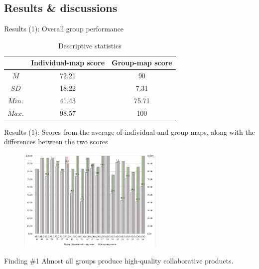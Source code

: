 \subsection{Results \& discussions}
\begin{frame}{Results (1): Overall group performance}
\begin{table}[tb]
    \caption{Descriptive statistics}
    \label{a1::group_performance}
    \begin{center}
        \begin{tabular}{c|c|c}
            \hline
            & Individual-map score & Group-map score\\
            \hline
            $M$ & 72.21 & 90 \\
            $SD$ & 18.22 & 7.31 \\
            $Min.$ & 41.43 & 75.71 \\
            $Max.$ & 98.57 & 100 \\
            \hline
        \end{tabular}
    \end{center}
\end{table}


\end{frame}

\begin{frame}{Results (1): Scores from the average of individual and group maps, along with the differences between the two scores}

\begin{figure}[tb]
    \begin{center}
        \includegraphics[width=70mm]{images/a1_mapscore_distribution.pdf}
    \end{center}
    \label{a1::mapscore_distribution}
\end{figure}

\begin{block}{Finding \#1}
    Almost all groups produce high-quality collaborative products.
\end{block}

\end{frame}

